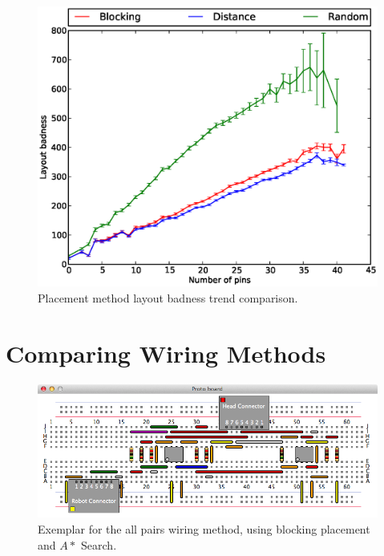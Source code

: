\begin{figure}
\begin{center}
\includegraphics[width=\textwidth]{Images/placement_badness_trend_comparison.eps}
\caption[Placement method layout badness trend comparison]{Placement method
layout badness trend comparison.}
\label{fig:placement_badness_trend}
\end{center}
\end{figure}

\section{Comparing Wiring Methods}

\begin{figure}[H]
\begin{center}
\includegraphics[width=\textwidth]{Images/exemplar_all_pairs.png}
\caption[All pairs method exemplar]{Exemplar for the all pairs wiring method,
using blocking placement and $A*$ Search.}
\end{center}
\end{figure}

